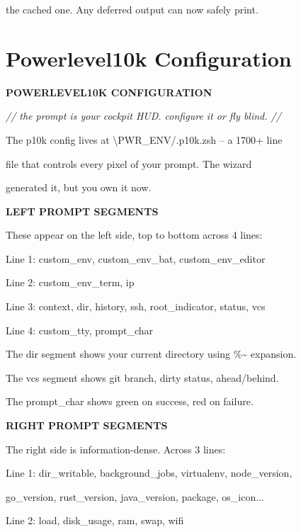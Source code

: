 \documentclass[11pt,a4paper,twoside]{book}
\begin{document}
the cached one. Any deferred output can now safely print.


\vspace{16pt}

\section{Powerlevel10k Configuration}


\vspace{10pt}
{\large\bfseries\color{neoncyan} POWERLEVEL10K CONFIGURATION}\vspace{6pt}

{\small\itshape\color{dimtext} // the prompt is your cockpit HUD. configure it or fly blind. //}

The p10k config lives at \textbackslash{}PWR\_ENV/.p10k.zsh -- a 1700+ line

file that controls every pixel of your prompt. The wizard

generated it, but you own it now.


\vspace{12pt}
{\bfseries\color{neonyellow} LEFT PROMPT SEGMENTS}\vspace{4pt}

These appear on the left side, top to bottom across 4 lines:

Line 1: custom\_env, custom\_env\_bat, custom\_env\_editor

Line 2: custom\_env\_term, ip

Line 3: context, dir, history, ssh, root\_indicator, status, vcs

Line 4: custom\_tty, prompt\_char

The dir segment shows your current directory using \%\textasciitilde{} expansion.

The vcs segment shows git branch, dirty status, ahead/behind.

The prompt\_char shows green on success, red on failure.


\vspace{12pt}
{\bfseries\color{neonyellow} RIGHT PROMPT SEGMENTS}\vspace{4pt}

The right side is information-dense. Across 3 lines:

Line 1: dir\_writable, background\_jobs, virtualenv, node\_version,

go\_version, rust\_version, java\_version, package, os\_icon...

Line 2: load, disk\_usage, ram, swap, wifi
\end{document}
